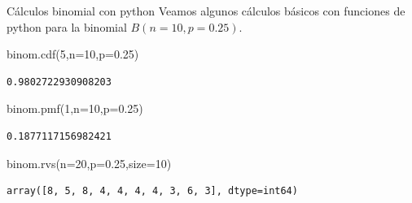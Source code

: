 \documentclass[
  ignorenonframetext,
  aspectratio=169]{beamer}
\newenvironment{Shaded}{\begin{snugshade}}{\end{snugshade}}
\newcommand{\DecValTok}[1]{\textcolor[rgb]{0.68,0.00,0.00}{#1}}
\newcommand{\FloatTok}[1]{\textcolor[rgb]{0.68,0.00,0.00}{#1}}
\newcommand{\NormalTok}[1]{\textcolor[rgb]{0.00,0.23,0.31}{#1}}
\newcommand{\OperatorTok}[1]{\textcolor[rgb]{0.37,0.37,0.37}{#1}}
\begin{document}
\begin{frame}[fragile]{Cálculos binomial con python}
\protect\hypertarget{cuxe1lculos-binomial-con-python}{}
Veamos algunos cálculos básicos con funciones de python para la binomial
\(B(n=10,p=0.25)\).

\begin{Shaded}
\begin{Highlighting}[]
\NormalTok{binom.cdf(}\DecValTok{5}\NormalTok{,n}\OperatorTok{=}\DecValTok{10}\NormalTok{,p}\OperatorTok{=}\FloatTok{0.25}\NormalTok{)}
\end{Highlighting}
\end{Shaded}

\begin{verbatim}
0.9802722930908203
\end{verbatim}

\begin{Shaded}
\begin{Highlighting}[]
\NormalTok{binom.pmf(}\DecValTok{1}\NormalTok{,n}\OperatorTok{=}\DecValTok{10}\NormalTok{,p}\OperatorTok{=}\FloatTok{0.25}\NormalTok{)}
\end{Highlighting}
\end{Shaded}

\begin{verbatim}
0.1877117156982421
\end{verbatim}

\begin{Shaded}
\begin{Highlighting}[]
\NormalTok{binom.rvs(n}\OperatorTok{=}\DecValTok{20}\NormalTok{,p}\OperatorTok{=}\FloatTok{0.25}\NormalTok{,size}\OperatorTok{=}\DecValTok{10}\NormalTok{)}
\end{Highlighting}
\end{Shaded}

\begin{verbatim}
array([8, 5, 8, 4, 4, 4, 4, 3, 6, 3], dtype=int64)
\end{verbatim}
\end{frame}
\end{document}
